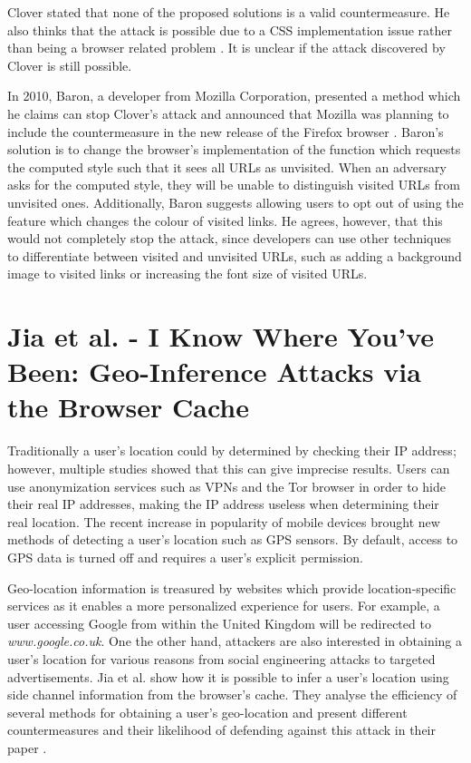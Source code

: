 \documentclass[10pt,a4paper,twoside]{book}
\begin{document}
Clover stated that none of the proposed solutions is a valid countermeasure. He also thinks that the attack is possible due to a CSS implementation issue rather than being a browser related problem \cite{cssvisited}. It is unclear if the attack discovered by Clover is still possible. 

In 2010, Baron, a developer from Mozilla Corporation, presented a method which he claims can stop Clover's attack and announced that Mozilla was planning to include the countermeasure in the new release of the Firefox browser \cite{fixedcssprivacy}. Baron's solution is to change the browser's implementation of the function which requests the computed style such that it sees all URLs as unvisited. When an adversary asks for the computed style, they will be unable to distinguish visited URLs from unvisited ones. Additionally, Baron suggests allowing users to opt out of using the feature which changes the colour of visited links. He agrees, however, that this would not completely stop the attack, since developers can use other techniques to differentiate between visited and unvisited URLs, such as adding a background image to visited links or increasing the font size of visited URLs.

\section{Jia et al. - I Know Where You've Been: Geo-Inference Attacks via the Browser Cache}
\label{location}
Traditionally a user's location could by determined by checking their IP address; however, multiple studies showed that this can give imprecise results. Users can use anonymization services such as VPNs and the Tor \cite{tor} browser in order to hide their real IP addresses, making the IP address useless when determining their real location. The recent increase in popularity of mobile devices brought new methods of detecting a user's location such as GPS sensors. By default, access to GPS data is turned off and requires a user's explicit permission. 

Geo-location information is treasured by websites which provide location-specific services as it enables a more personalized experience for users. For example, a user accessing Google from within the United Kingdom will be redirected to \textit{www.google.co.uk}. One the other hand, attackers are also interested in obtaining a user's location for various reasons from social engineering attacks to targeted advertisements. Jia et al. \cite{jia2015know} show how it is possible to infer a user's location using side channel information from the browser's cache. They analyse the efficiency of several methods for obtaining a user's geo-location and present different countermeasures and their likelihood of defending against this attack in their paper \cite{jia2015know}.
\end{document}
